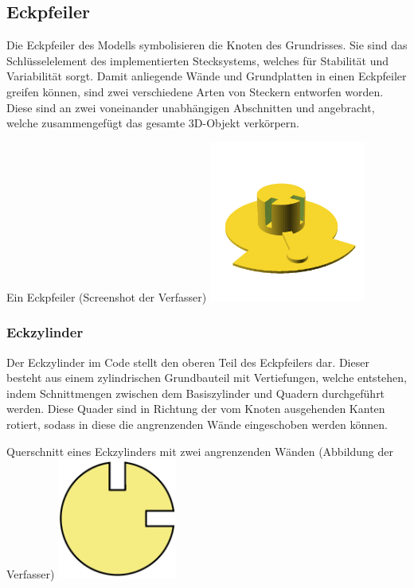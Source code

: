\subsection{Eckpfeiler}
Die Eckpfeiler des Modells symbolisieren die Knoten des Grundrisses.
Sie sind das Schlüsselelement des implementierten Stecksystems, welches für Stabilität und Variabilität sorgt.
Damit anliegende Wände und Grundplatten in einen Eckpfeiler greifen können, sind zwei verschiedene Arten von Steckern entworfen worden.
Diese sind an zwei voneinander unabhängigen Abschnitten  und  angebracht, welche zusammengefügt das gesamte 3D-Objekt verkörpern.

\begin{Bild}{Ein Eckpfeiler (Screenshot der Verfasser)}
	\includegraphics[height=200px]{Bilder/Untereinheit_Ecke}
\end{Bild}

\subsubsection{Eckzylinder}
Der Eckzylinder im Code  stellt den oberen Teil des Eckpfeilers dar.
Dieser besteht aus einem zylindrischen Grundbauteil mit Vertiefungen, welche entstehen, indem Schnittmengen zwischen dem Basiszylinder und Quadern durchgeführt werden.
Diese Quader sind in Richtung der vom Knoten ausgehenden Kanten rotiert, sodass in diese die angrenzenden Wände eingeschoben werden können.

\begin{Bild}{Querschnitt eines Eckzylinders mit zwei angrenzenden Wänden (Abbildung der Verfasser)}
	\includegraphics[height=150px]{Bilder/CornerCylinder2D-06.png}
\end{Bild}

